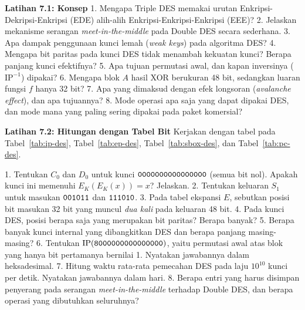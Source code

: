 
\begin{obereflection}
\textbf{Latihan 7.1: Konsep}
1. Mengapa Triple DES memakai urutan Enkripsi-Dekripsi-Enkripsi (EDE) alih-alih
   Enkripsi-Enkripsi-Enkripsi (EEE)?
2. Jelaskan mekanisme serangan \textit{meet-in-the-middle} pada Double DES
   secara sederhana.
3. Apa dampak penggunaan kunci lemah (\textit{weak keys}) pada algoritma DES?
4. Mengapa bit paritas pada kunci DES tidak menambah kekuatan kunci? Berapa
   panjang kunci efektifnya?
5. Apa tujuan permutasi awal, dan kapan inversinya ($\text{IP}^{-1}$) dipakai?
6. Mengapa blok $A$ hasil XOR berukuran 48 bit, sedangkan luaran fungsi $f$
   hanya 32 bit?
7. Apa yang dimaksud dengan efek longsoran (\textit{avalanche effect}), dan apa
   tujuannya?
8. Mode operasi apa saja yang dapat dipakai DES, dan mode mana yang paling
   sering dipakai pada paket komersial?
\end{obereflection}

\begin{obereflection}
\textbf{Latihan 7.2: Hitungan dengan Tabel Bit}
Kerjakan dengan tabel pada Tabel~\ref{tab:ip-des}, Tabel~\ref{tab:ep-des},
Tabel~\ref{tab:sbox-des}, dan Tabel~\ref{tab:pc-des}.

1. Tentukan $C_0$ dan $D_0$ untuk kunci $\texttt{0000000000000000}$ (semua bit
   nol). Apakah kunci ini memenuhi $E_K(E_K(x)) = x$? Jelaskan.
2. Tentukan keluaran $S_1$ untuk masukan $\texttt{001011}$ dan $\texttt{111010}$.
3. Pada tabel ekspansi $E$, sebutkan posisi bit masukan 32 bit yang muncul
   \emph{dua kali} pada keluaran 48 bit.
4. Pada kunci DES, posisi berapa saja yang merupakan bit paritas? Berapa banyak?
5. Berapa banyak kunci internal yang dibangkitkan DES dan berapa panjang
   masing-masing?
6. Tentukan $\text{IP}(\texttt{8000000000000000})$, yaitu permutasi awal atas blok
   yang hanya bit pertamanya bernilai 1. Nyatakan jawabannya dalam heksadesimal.
7. Hitung waktu rata-rata pemecahan DES pada laju $10^{10}$ kunci per detik.
   Nyatakan jawabannya dalam hari.
8. Berapa entri yang harus disimpan penyerang pada serangan
   \textit{meet-in-the-middle} terhadap Double DES, dan berapa operasi yang
   dibutuhkan seluruhnya?
\end{obereflection}
